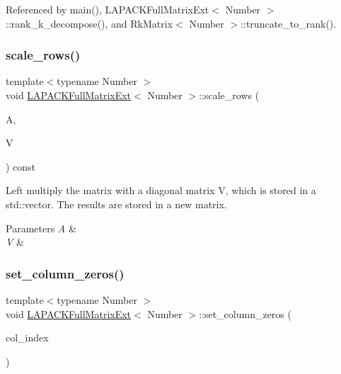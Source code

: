 Referenced by main(), L\+A\+P\+A\+C\+K\+Full\+Matrix\+Ext$<$ Number $>$\+::rank\+\_\+k\+\_\+decompose(), and Rk\+Matrix$<$ Number $>$\+::truncate\+\_\+to\+\_\+rank().

\mbox{\label{classLAPACKFullMatrixExt_a88b31beb3170825867a0b15b59770d61}} 
\subsubsection{\texorpdfstring{scale\+\_\+rows()}{scale\_rows()}\hspace{0.1cm}{\footnotesize\ttfamily [2/2]}}
{\footnotesize\ttfamily template$<$typename Number $>$ \\
void \hyperlink{classLAPACKFullMatrixExt}{L\+A\+P\+A\+C\+K\+Full\+Matrix\+Ext}$<$ Number $>$\+::scale\+\_\+rows (\begin{DoxyParamCaption}\item[{\hyperlink{classLAPACKFullMatrixExt}{L\+A\+P\+A\+C\+K\+Full\+Matrix\+Ext}$<$ Number $>$ \&}]{A,  }\item[{const std\+::vector$<$ typename numbers\+::\+Number\+Traits$<$ Number $>$\+::real\+\_\+type $>$ \&}]{V }\end{DoxyParamCaption}) const}

Left multiply the matrix with a diagonal matrix {\ttfamily V}, which is stored in a std\+::vector. The results are stored in a new matrix. 
\begin{DoxyParams}{Parameters}
{\em A} & \\
\hline
{\em V} & \\
\hline
\end{DoxyParams}
\mbox{\label{classLAPACKFullMatrixExt_a0ee8a3f97dc3f391f9c963d6a275a25b}} 
\subsubsection{\texorpdfstring{set\+\_\+column\+\_\+zeros()}{set\_column\_zeros()}}
{\footnotesize\ttfamily template$<$typename Number $>$ \\
void \hyperlink{classLAPACKFullMatrixExt}{L\+A\+P\+A\+C\+K\+Full\+Matrix\+Ext}$<$ Number $>$\+::set\+\_\+column\+\_\+zeros (\begin{DoxyParamCaption}\item[{const \hyperlink{classLAPACKFullMatrixExt_a5cf5f4a6104dc17029210b5ca52bf574}{size\+\_\+type}}]{col\+\_\+index }\end{DoxyParamCaption})}

